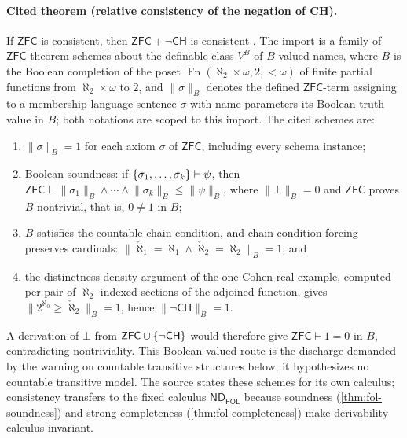 \documentclass[11pt,oneside,openany]{book}
\theoremstyle{definition}
\theoremstyle{plain}
\theoremstyle{remark}
\DeclarePairedDelimiter{\set}{\lbrace}{\rbrace}
\newcommand{\derives}{\vdash}
\newcommand{\bottom}{\bot}
\newcommand{\ND}{\mathsf{ND}}
\newcommand{\ZFC}{\mathsf{ZFC}}
\newcommand{\FOL}{\mathsf{FOL}}
\begin{document}
\paragraph{Cited theorem (relative consistency of the negation of CH).}
If \(\ZFC\) is consistent, then \(\ZFC+\neg\mathsf{CH}\) is consistent
\cite[Chapter~14, pp.~201--224]{Jech2003}.  The import is a family of
\(\ZFC\)-theorem schemes about the definable class \(V^{B}\) of
\(B\)-valued names, where \(B\) is the Boolean completion of the poset
\(\operatorname{Fn}(\aleph_2\times\omega,2,{<}\omega)\) of finite partial
functions from \(\aleph_2\times\omega\) to \(2\), and
\(\lVert\sigma\rVert_{B}\) denotes the defined \(\ZFC\)-term assigning to
a membership-language sentence \(\sigma\) with name parameters its Boolean
truth value in \(B\); both notations are scoped to this import.  The
cited schemes are:
\begin{enumerate}
  \item \(\lVert\sigma\rVert_{B}=1\) for each axiom \(\sigma\) of
        \(\ZFC\), including every schema instance;
  \item Boolean soundness: if
        \(\set{\sigma_1,\ldots,\sigma_k}\derives\psi\), then
        \(\ZFC\derives
          \lVert\sigma_1\rVert_{B}\wedge\cdots\wedge
          \lVert\sigma_k\rVert_{B}\leq\lVert\psi\rVert_{B}\),
        where \(\lVert\bottom\rVert_{B}=0\) and \(\ZFC\) proves \(B\)
        nontrivial, that is, \(0\ne1\) in \(B\);
  \item \(B\) satisfies the countable chain condition, and
        chain-condition forcing preserves cardinals:
        \(\lVert\check\aleph_1=\aleph_1\land
           \check\aleph_2=\aleph_2\rVert_{B}=1\); and
  \item the distinctness density argument of the one-Cohen-real example,
        computed per pair of \(\aleph_2\)-indexed sections of the adjoined
        function, gives
        \(\lVert 2^{\aleph_0}\geq\check\aleph_2\rVert_{B}=1\), hence
        \(\lVert\neg\mathsf{CH}\rVert_{B}=1\).
\end{enumerate}
A derivation of \(\bottom\) from \(\ZFC\cup\set{\neg\mathsf{CH}}\) would
therefore give \(\ZFC\derives 1=0\) in \(B\), contradicting
nontriviality.  This Boolean-valued route is the discharge demanded by
the warning on countable transitive structures below; it hypothesizes no
countable transitive model.  The source states these schemes for its own
calculus; consistency transfers to the fixed calculus \(\ND_{\FOL}\)
because soundness (\cref{thm:fol-soundness}) and strong completeness
(\cref{thm:fol-completeness}) make derivability calculus-invariant.
\end{document}
